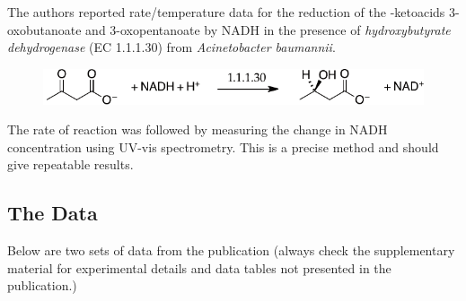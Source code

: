 \documentclass{tufte-handout}
\begin{document}
The authors reported rate/temperature data for the reduction of the \textbeta -ketoacids 3-oxobutanoate and 3-oxopentanoate by NADH in the presence of \textit{hydroxybutyrate dehydrogenase} (EC 1.1.1.30) from \textit{Acinetobacter baumannii}.


\begin{figure}[h!]
  \centering
  \includegraphics[scale=0.7]{images/HBDH_reaction1.pdf}
  \label{fig:react1}
\end{figure}

The rate of reaction was followed by measuring the change in NADH concentration using UV-vis spectrometry. This is a precise method and should give repeatable results.

\subsection{The Data}

Below are two sets of data from the publication (always check the supplement\-ary material for experimental details and data tables not presented in the publication.)
\end{document}
